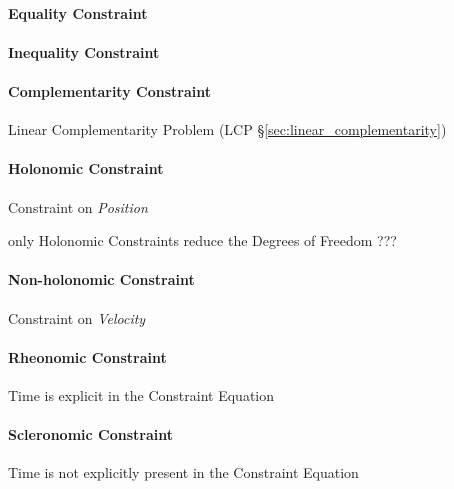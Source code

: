 \paragraph{Equality Constraint}\label{sec:equality_constraint}\hfill

\paragraph{Inequality Constraint}\label{sec:inequality_constraint}\hfill

\paragraph{Complementarity Constraint}
\label{sec:complementarity_constraint}\hfill

\fist Linear Complementarity Problem (LCP \S\ref{sec:linear_complementarity})



\paragraph{Holonomic Constraint}\label{sec:holonomic_constraint}\hfill

Constraint on \emph{Position}

only Holonomic Constraints reduce the Degrees of Freedom ???



\paragraph{Non-holonomic Constraint}\label{sec:nonholonomic_constraint}\hfill

Constraint on \emph{Velocity}



\paragraph{Rheonomic Constraint}\label{sec:rheonomic_constraint}\hfill

Time is explicit in the Constraint Equation



\paragraph{Scleronomic Constraint}\label{sec:scleronomic_constraint}\hfill

Time is not explicitly present in the Constraint Equation



